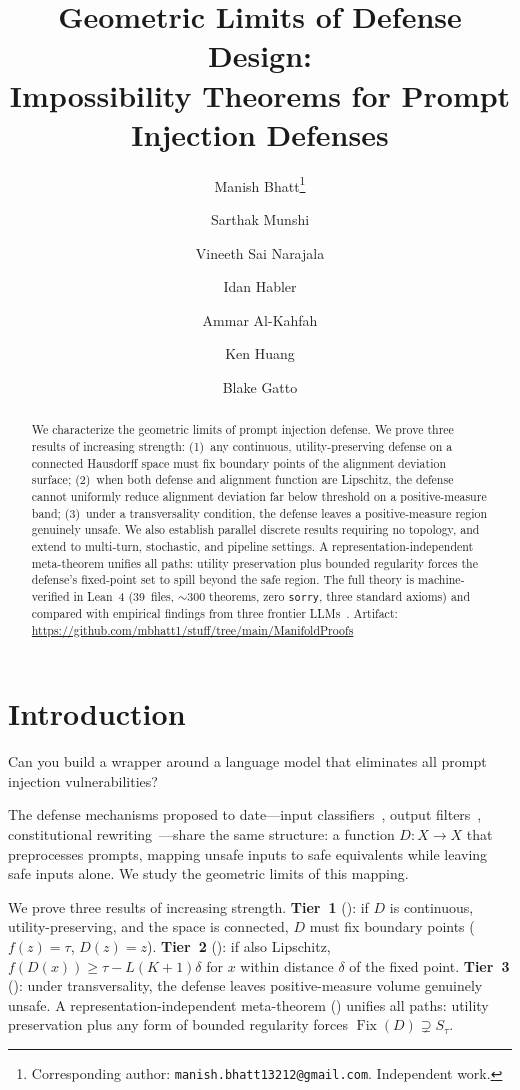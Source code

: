 \documentclass[11pt]{article}
\title{Geometric Limits of Defense Design:\\
  Impossibility Theorems for Prompt Injection Defenses}
\author{
  Manish Bhatt\thanks{Corresponding author: \texttt{manish.bhatt13212@gmail.com}. Independent work.} \\
  \and Sarthak Munshi \\ \and Vineeth Sai Narajala \\
  \and Idan Habler \\ \and Ammar Al-Kahfah \\
  \and Ken Huang \\ \and Blake Gatto \\
}
\date{}
\newcommand{\Fix}{\operatorname{Fix}}
\begin{document}
\maketitle

\begin{abstract}
We characterize the geometric limits of prompt injection defense. We prove three results of increasing strength: (1)~any continuous, utility-preserving defense on a connected Hausdorff space must fix boundary points of the alignment deviation surface; (2)~when both defense and alignment function are Lipschitz, the defense cannot uniformly reduce alignment deviation far below threshold on a positive-measure band; (3)~under a transversality condition, the defense leaves a positive-measure region genuinely unsafe. We also establish parallel discrete results requiring no topology, and extend to multi-turn, stochastic, and pipeline settings. A representation-independent meta-theorem unifies all paths: utility preservation plus bounded regularity forces the defense's fixed-point set to spill beyond the safe region. The full theory is machine-verified in Lean~4 (39~files, $\sim$300 theorems, zero \texttt{sorry}, three standard axioms) and compared with empirical findings from three frontier LLMs~\cite{bhatt2025manifold}. Artifact: \url{https://github.com/mbhatt1/stuff/tree/main/ManifoldProofs}
\end{abstract}


\section{Introduction}
\label{sec:intro}

Can you build a wrapper around a language model that eliminates all prompt injection vulnerabilities?

The defense mechanisms proposed to date---input classifiers~\cite{alon2023detecting}, output filters~\cite{inan2023llama}, constitutional rewriting~\cite{bai2022constitutional}---share the same structure: a function $D\colon X \to X$ that preprocesses prompts, mapping unsafe inputs to safe equivalents while leaving safe inputs alone. We study the geometric limits of this mapping.

We prove three results of increasing strength. \textbf{Tier~1} (): if $D$ is continuous, utility-preserving, and the space is connected, $D$ must fix boundary points ($f(z)=\tau$, $D(z)=z$). \textbf{Tier~2} (): if also Lipschitz, $f(D(x)) \geq \tau - L(K+1)\delta$ for $x$ within distance $\delta$ of the fixed point. \textbf{Tier~3} (): under transversality, the defense leaves positive-measure volume genuinely unsafe. A representation-independent meta-theorem () unifies all paths: utility preservation plus any form of bounded regularity forces $\Fix(D) \supsetneq S_\tau$.
\end{document}

